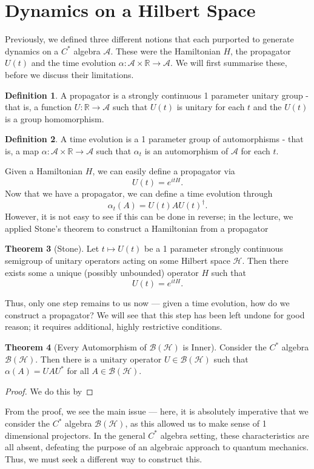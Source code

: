 \documentclass[prb,12pt, nofootinbib]{revtex4-2}
\theoremstyle{definition}
\newtheorem{Theorem}{Theorem}
\theoremstyle{definition}
\theoremstyle{definition}
\theoremstyle{definition}
\newtheorem{Definition}[Theorem]{Definition}
\newcommand{\R}{\mathbb{R}}
\begin{document}
\section{Dynamics on a Hilbert Space}
Previously, we defined three different notions that each purported to generate dynamics on a $C^*$ algebra $\mathcal{A}$. These were the Hamiltonian $H$, the propagator $U(t)$ and the time evolution $\alpha: \mathcal{A}\times \R \to \mathcal{A}$. We will first summarise these, before we discuss their limitations.

\begin{Definition}
	A propagator is a strongly continuous 1 parameter unitary group - that is, a function $U: \R \to \mathcal{A}$ such that $U(t)$ is unitary for each $t$ and the $U(t)$ is a group homomorphism.
\end{Definition}
\begin{Definition}
	A time evolution is a 1 parameter group of automorphisms - that is, a map $\alpha: \mathcal{A}\times \R \to \mathcal{A}$ such that $\alpha_t$ is an automorphism of $\mathcal{A}$ for each $t$.
\end{Definition}
Given a Hamiltonian $H$, we can easily define a propagator via
\[
	U(t) = e^{itH}
.\] 
Now that we have a propagator, we can define a time evolution through
\[
\alpha_t(A) = U(t)AU(t)^\dagger
.\] 
However, it is not easy to see if this can be done in reverse; in the lecture, we applied Stone's theorem to construct a Hamiltonian from a propagator	
\begin{Theorem}[Stone]
		Let $t\mapsto U(t)$ be a 1 parameter strongly continuous semigroup of unitary operators acting on some Hilbert space $\mathcal{H}$. Then there exists some a unique (possibly unbounded) operator $H$ such that
		\[U(t) = e^{itH}.\]
	\end{Theorem} 
	Thus, only one step remains to us now --- given a time evolution, how do we construct a propagator? We will see that this step has been left undone for good reason; it requires additional, highly restrictive conditions.
\begin{Theorem}[Every Automorphism of $\mathcal{B}(\mathcal{H})$ is Inner]
Consider the $C^*$ algebra $\mathcal{B}(\mathcal{H})$. Then there is a unitary operator $U\in \mathcal{B}(\mathcal{H})$ such that $\alpha(A) = UAU^*$ for all $A\in \mathcal{B}(\mathcal{H})$.
\end{Theorem}
\begin{proof}
	We do this by
\end{proof}
From the proof, we see the main issue --- here, it is absolutely imperative that we consider the $C^*$ algebra $\mathcal{B}(\mathcal{H})$, as this allowed us to make sense of 1 dimensional projectors. In the general $C^*$ algebra setting, these characteristics are all absent, defeating the purpose of an algebraic approach to quantum mechanics. Thus, we must seek a different way to construct this.
\end{document}
